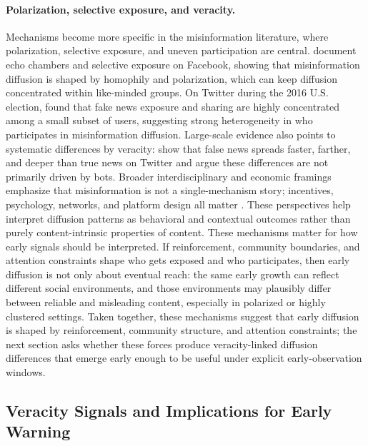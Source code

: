 \paragraph{Polarization, selective exposure, and veracity.}
Mechanisms become more specific in the misinformation literature, where polarization, selective exposure, and uneven participation are central. \citet{del_vicario_spreading_2016} document echo chambers and selective exposure on Facebook, showing that misinformation diffusion is shaped by homophily and polarization, which can keep diffusion concentrated within like-minded groups. On Twitter during the 2016 U.S. election, \citet{grinberg_fake_2019} found that fake news exposure and sharing are highly concentrated among a small subset of users, suggesting strong heterogeneity in who participates in misinformation diffusion. Large-scale evidence also points to systematic differences by veracity: \citet{vosoughi_spread_2018} show that false news spreads faster, farther, and deeper than true news on Twitter and argue these differences are not primarily driven by bots. Broader interdisciplinary and economic framings emphasize that misinformation is not a single-mechanism story; incentives, psychology, networks, and platform design all matter \citep{allcott_gentzkow_2017, lazer_science_2018}. These perspectives help interpret diffusion patterns as behavioral and contextual outcomes rather than purely content-intrinsic properties of content. These mechanisms matter for how early signals should be interpreted. If reinforcement, community boundaries, and attention constraints shape who gets exposed and who participates, then early diffusion is not only about eventual reach: the same early growth can reflect different social environments, and those environments may plausibly differ between reliable and misleading content, especially in polarized or highly clustered settings. Taken together, these mechanisms suggest that early diffusion is shaped by reinforcement, community structure, and attention constraints; the next section asks whether these forces produce veracity-linked diffusion differences that emerge early enough to be useful under explicit early-observation windows.

\subsection{Veracity Signals and Implications for Early Warning}


